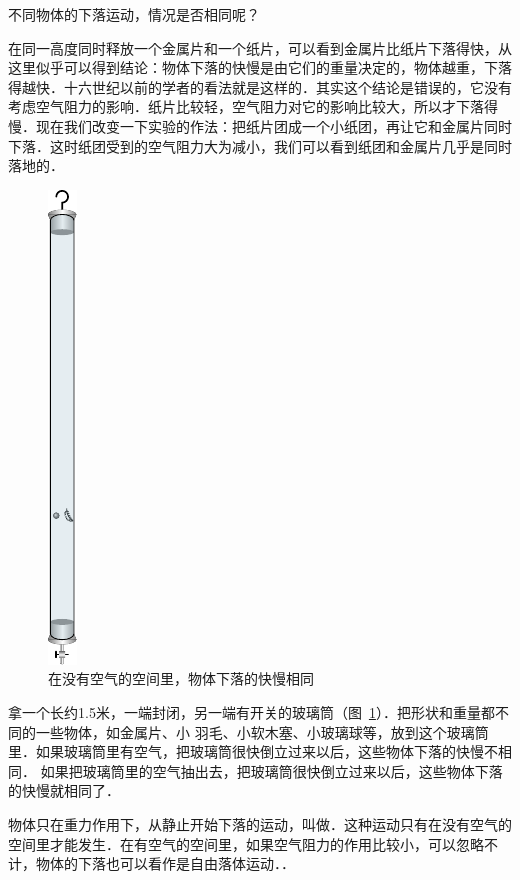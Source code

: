 不同物体的下落运动，情况是否相同呢？

在同一高度同时释放一个金属片和一个纸片，可以看到金属片比纸片下落得快，从这里似乎可以得到结论：物体下落的快慢是由它们的重量决定的，物体越重，下落得越快．十六世纪以前的学者的看法就是这样的．其实这个结论是错误的，它没有考虑空气阻力的影响．纸片比较轻，空气阻力对它的影响比较大，所以才下落得慢．现在我们改变一下实验的作法：把纸片团成一个小纸团，再让它和金属片同时下落．这时纸团受到的空气阻力大为减小，我们可以看到纸团和金属片几乎是同时落地的．
\begin{figure}[htp]
\centering
\includegraphics{fig/A/2-20.pdf}
\caption{在没有空气的空间里，物体下落的快慢相同}\label{fig_A_2-20}
\end{figure}

拿一个长约1.5米，一端封闭，另一端有开关的玻璃筒（图~\ref{fig_A_2-20}）．把形状和重量都不同的一些物体，如金属片、小
羽毛、小软木塞、小玻璃球等，放到这个玻璃筒里．如果玻璃筒里有空气，把玻璃筒很快倒立过来以后，这些物体下落的快慢不相同．
如果把玻璃筒里的空气抽出去，把玻璃筒很快倒立过来以后，这些物体下落的快慢就相同了．



物体只在重力作用下，从静止开始下落的运动，叫做．这种运动只有在没有空气的空间里才能发生．在有空气的空间里，如果空气阻力的作用比较小，可以忽略不计，物体的下落也可以看作是自由落体运动．．

